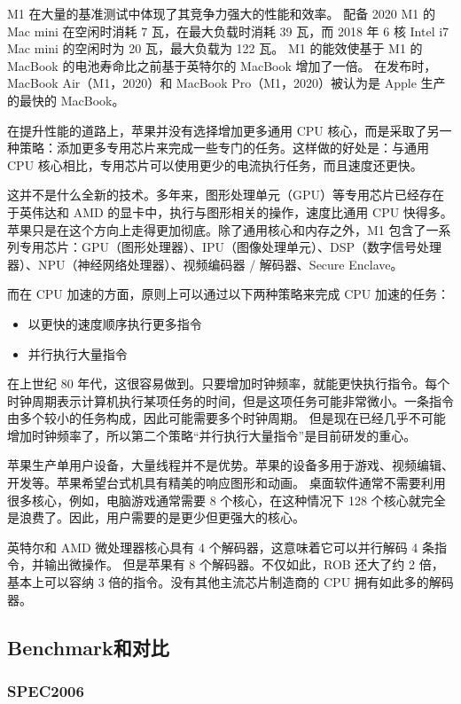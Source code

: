 \documentclass[a4paper]{article}
\begin{document}
M1 在大量的基准测试中体现了其竞争力强大的性能和效率。
配备 2020 M1 的 Mac mini 在空闲时消耗 7 瓦，在最大负载时消耗 39 瓦，而 2018 年 6 核 Intel i7 Mac mini 的空闲时为 20 瓦，最大负载为 122 瓦。 M1 的能效使基于 M1 的 MacBook 的电池寿命比之前基于英特尔的 MacBook 增加了一倍。
在发布时，MacBook Air（M1，2020）和 MacBook Pro（M1，2020）被认为是 Apple 生产的最快的 MacBook。

在提升性能的道路上，苹果并没有选择增加更多通用 CPU 核心，而是采取了另一种策略：添加更多专用芯片来完成一些专门的任务。这样做的好处是：与通用 CPU 核心相比，专用芯片可以使用更少的电流执行任务，而且速度还更快。

这并不是什么全新的技术。多年来，图形处理单元（GPU）等专用芯片已经存在于英伟达和 AMD 的显卡中，执行与图形相关的操作，速度比通用 CPU 快得多。
苹果只是在这个方向上走得更加彻底。除了通用核心和内存之外，M1 包含了一系列专用芯片：GPU（图形处理器）、IPU（图像处理单元）、DSP（数字信号处理器）、NPU（神经网络处理器）、视频编码器 / 解码器、Secure Enclave。

而在 CPU 加速的方面，原则上可以通过以下两种策略来完成 CPU 加速的任务：

\begin{itemize}
  \item 以更快的速度顺序执行更多指令
  \item 并行执行大量指令
\end{itemize}

在上世纪 80 年代，这很容易做到。只要增加时钟频率，就能更快执行指令。每个时钟周期表示计算机执行某项任务的时间，但是这项任务可能非常微小。一条指令由多个较小的任务构成，因此可能需要多个时钟周期。
但是现在已经几乎不可能增加时钟频率了，所以第二个策略“并行执行大量指令”是目前研发的重心。

苹果生产单用户设备，大量线程并不是优势。苹果的设备多用于游戏、视频编辑、开发等。苹果希望台式机具有精美的响应图形和动画。
桌面软件通常不需要利用很多核心，例如，电脑游戏通常需要 8 个核心，在这种情况下 128 个核心就完全是浪费了。因此，用户需要的是更少但更强大的核心。

英特尔和 AMD 微处理器核心具有 4 个解码器，这意味着它可以并行解码 4 条指令，并输出微操作。
但是苹果有 8 个解码器。不仅如此，ROB 还大了约 2 倍，基本上可以容纳 3 倍的指令。没有其他主流芯片制造商的 CPU 拥有如此多的解码器。

\subsection{Benchmark和对比}

\subsubsection{SPEC2006}
\end{document}
